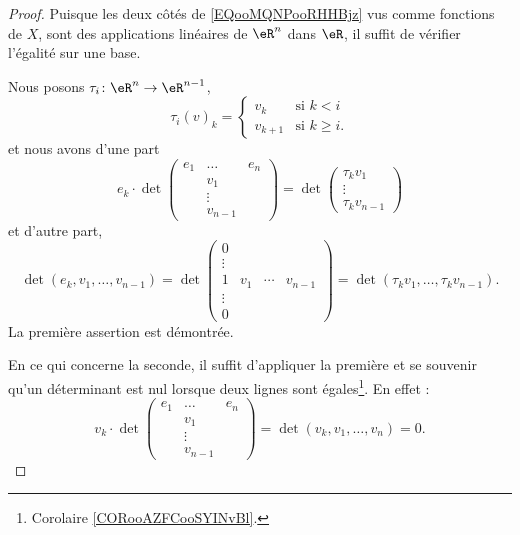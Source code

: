 \begin{proof}
    Puisque les deux côtés de \eqref{EQooMQNPooRHHBjz} vus comme fonctions de \( X\), sont des applications linéaires de \( \eR^n\) dans \( \eR\), il suffit de vérifier l'égalité sur une base.

    Nous posons \( \tau_i\colon \eR^n\to \eR^{n-1}\),
    \begin{equation}
        \tau_i(v)_k=\begin{cases}
            v_k         &   \text{si } k<i\\
            v_{k+1}     &   \text{si } k\geq i\text{.}
        \end{cases}
    \end{equation}
    et nous avons d'une part
    \begin{equation}
        e_k\cdot
                \det
                \begin{pmatrix}
                  e_1   &   \ldots    &   e_n     \\
                        &   v_1       &           \\
                        &   \vdots    &           \\
                        &   v_{n-1}   &
                 \end{pmatrix}
                 =\det\begin{pmatrix}
                     \tau_kv_1   \\
                     \vdots   \\
                     \tau_kv_{n-1}
                 \end{pmatrix}
            \end{equation}
     et d'autre part,
     \begin{equation}
         \det(e_k,v_1,\ldots, v_{n-1})=\det
         \begin{pmatrix}
             0&&&\\
             \vdots&&&\\
             1&v_1&\cdots&v_{n-1}\\
             \vdots&&&\\
             0&&&
         \end{pmatrix}=\det(\tau_k v_1,\ldots, \tau_k v_{n-1}).
     \end{equation}
     La première assertion est démontrée.

     En ce qui concerne la seconde, il suffit d'appliquer la première et se souvenir qu'un déterminant est nul lorsque deux lignes sont égales\footnote{Corolaire \ref{CORooAZFCooSYINvBl}.}. En effet :
     \begin{equation}
         v_k\cdot \det
                \begin{pmatrix}
                  e_1   &   \ldots    &   e_n     \\
                        &   v_1       &           \\
                        &   \vdots    &           \\
                        &   v_{n-1}    &
                 \end{pmatrix}
                 = \det(v_k,v_1,\ldots, v_n)=0.
     \end{equation}
\end{proof}
